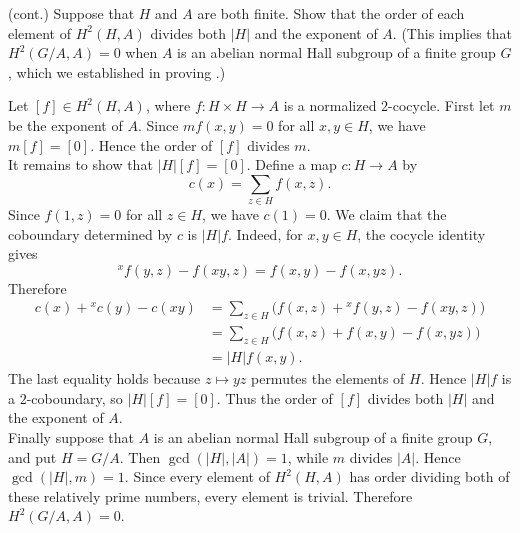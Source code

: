 \documentclass[../Odyssey_Project.tex]{subfiles}
\begin{document}
\begin{exercise}
\label{ex:9.11}
(cont.) Suppose that $H$ and $A$ are both finite. Show that the order of each element of $H^2(H, A)$ divides both $|H|$ and the exponent of $A$. (This implies that $H^2(G/A, A) = 0$ when $A$ is an abelian normal Hall subgroup of a finite group $G$, which we established in proving .)
\end{exercise}
\begin{solution}
Let $[f]\in H^2(H,A)$, where $f\colon H\times H\to A$ is a normalized $2$-cocycle. First let $m$ be the exponent of $A$. Since $mf(x,y)=0$ for all $x,y\in H$, we have $m[f]=[0]$. Hence the order of $[f]$ divides $m$.\\
It remains to show that $\lvert H\rvert[f]=[0]$. Define a map $c\colon H\to A$ by
\[
    c(x)=\sum_{z\in H} f(x,z).
\]
Since $f(1,z)=0$ for all $z\in H$, we have $c(1)=0$. We claim that the coboundary determined by $c$ is $\lvert H\rvert f$. Indeed, for $x,y\in H$, the cocycle identity gives
\[
    {}^x f(y,z)-f(xy,z)
    =
    f(x,y)-f(x,yz).
\]
Therefore
\[
\begin{aligned}
    c(x)+{}^x c(y)-c(xy)
    &=
    \sum_{z\in H}\bigl(f(x,z)+{}^x f(y,z)-f(xy,z)\bigr)\\
    &=
    \sum_{z\in H}\bigl(f(x,z)+f(x,y)-f(x,yz)\bigr)\\
    &=
    \lvert H\rvert f(x,y).
\end{aligned}
\]
The last equality holds because $z\mapsto yz$ permutes the elements of $H$. Hence $\lvert H\rvert f$ is a $2$-coboundary, so $\lvert H\rvert[f]=[0]$. Thus the order of $[f]$ divides both $\lvert H\rvert$ and the exponent of $A$.\\
Finally suppose that $A$ is an abelian normal Hall subgroup of a finite group $G$, and put $H=G/A$. Then $\gcd(\lvert H\rvert,\lvert A\rvert)=1$, while $m$ divides $\lvert A\rvert$. Hence $\gcd(\lvert H\rvert,m)=1$. Since every element of $H^2(H,A)$ has order dividing both of these relatively prime numbers, every element is trivial. Therefore $H^2(G/A,A)=0$.
\end{solution}
\end{document}
